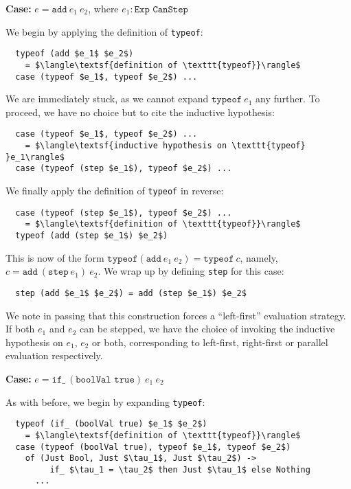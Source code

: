 \documentclass[manuscript,screen,review,sigplan]{acmart}
\begin{document}
\textbf{Case:} $e = \texttt{add}\ e_1\ e_2$, where $e_1 : \texttt{Exp CanStep}$

We begin by applying the definition of \texttt{typeof}:

\begin{lstlisting}
  typeof (add $e_1$ $e_2$)
    = $\langle\textsf{definition of \texttt{typeof}}\rangle$
  case (typeof $e_1$, typeof $e_2$) ...
\end{lstlisting}

We are immediately stuck, as we cannot expand $\texttt{typeof}\ e_1$ any
further. To proceed, we have no choice but to cite the inductive hypothesis:

\begin{lstlisting}
  case (typeof $e_1$, typeof $e_2$) ...
    = $\langle\textsf{inductive hypothesis on \texttt{typeof} }e_1\rangle$
  case (typeof (step $e_1$), typeof $e_2$) ...
\end{lstlisting}

We finally apply the definition of \texttt{typeof} in reverse:

\begin{lstlisting}
  case (typeof (step $e_1$), typeof $e_2$) ...
    = $\langle\textsf{definition of \texttt{typeof}}\rangle$
  typeof (add (step $e_1$) $e_2$)
\end{lstlisting}

This is now of the form $\texttt{typeof} (\texttt{add}\ e_1\ e_2) = \texttt{typeof}\ c$,
namely, $c = \texttt{add}\ (\texttt{step}\ e_1)\ e_2$. We wrap up by defining
\texttt{step} for this case:

\begin{lstlisting}
  step (add $e_1$ $e_2$) = add (step $e_1$) $e_2$
\end{lstlisting}

We note in passing that this construction forces a ``left-first'' evaluation
strategy. If both $e_1$ and $e_2$ can be stepped, we have the choice of
invoking the inductive hypothesis on $e_1$, $e_2$ or both, corresponding to
left-first, right-first or parallel evaluation respectively.

\textbf{Case:} $e = \texttt{if\_}\ (\texttt{boolVal true})\ e_1\ e_2$

As with before, we begin by expanding \texttt{typeof}:

\begin{lstlisting}
  typeof (if_ (boolVal true) $e_1$ $e_2$)
    = $\langle\textsf{definition of \texttt{typeof}}\rangle$
  case (typeof (boolVal true), typeof $e_1$, typeof $e_2$)
    of (Just Bool, Just $\tau_1$, Just $\tau_2$) ->
         if_ $\tau_1 = \tau_2$ then Just $\tau_1$ else Nothing
      ...
\end{lstlisting}
\end{document}
